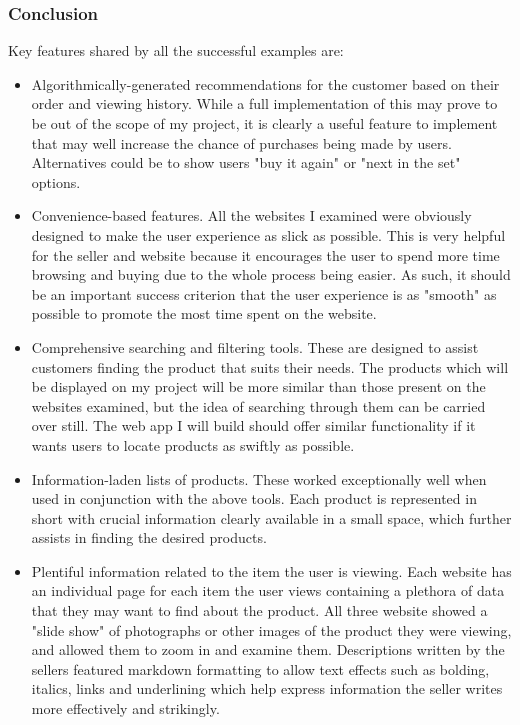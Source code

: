 \documentclass{article}
\begin{document}
    \subsubsection{Conclusion}
    Key features shared by all the successful examples are:
    \begin{itemize}
    \item Algorithmically-generated recommendations for the customer based on their order and viewing history.
    While a full implementation of this may prove to be out of the scope of my project, it is clearly a useful feature to implement that may well increase the chance of purchases being made by users.
    Alternatives could be to show users "buy it again" or "next in the set" options.
    \item Convenience-based features.
    All the websites I examined were obviously designed to make the user experience as slick as possible.
    This is very helpful for the seller and website because it encourages the user to spend more time browsing and buying due to the whole process being easier.
    As such, it should be an important success criterion that the user experience is as "smooth" as possible to promote the most time spent on the website.
    \item Comprehensive searching and filtering tools.
    These are designed to assist customers finding the product that suits their needs.
    The products which will be displayed on my project will be more similar than those present on the websites examined, but the idea of searching through them can be carried over still.
    The web app I will build should offer similar functionality if it wants users to locate products as swiftly as possible.
    \item Information-laden lists of products.
    These worked exceptionally well when used in conjunction with the above tools.
    Each product is represented in short with crucial information clearly available in a small space, which further assists in finding the desired products.
    \item Plentiful information related to the item the user is viewing.
    Each website has an individual page for each item the user views containing a plethora of data that they may want to find about the product.
    All three website showed a "slide show" of photographs or other images of the product they were viewing, and allowed them to zoom in and examine them.
    Descriptions written by the sellers featured markdown formatting to allow text effects such as bolding, italics, links and underlining which help express information the seller writes more effectively and strikingly.

\end{itemize}
\end{document}
